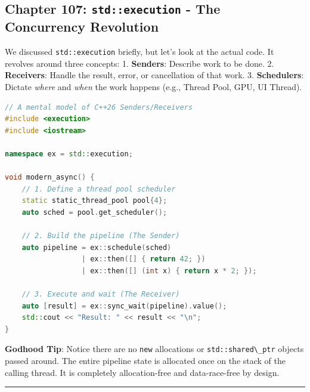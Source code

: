 \hypertarget{chapter-107-stdexecution---the-concurrency-revolution}{%
\subsection{\texorpdfstring{Chapter 107: \texttt{std::execution} - The
Concurrency
Revolution}{Chapter 107: std::execution - The Concurrency Revolution}}\label{chapter-107-stdexecution---the-concurrency-revolution}}

We discussed \passthrough{\lstinline!std::execution!} briefly, but let's
look at the actual code. It revolves around three concepts: 1.
\textbf{Senders}: Describe work to be done. 2. \textbf{Receivers}:
Handle the result, error, or cancellation of that work. 3.
\textbf{Schedulers}: Dictate \emph{where} and \emph{when} the work
happens (e.g., Thread Pool, GPU, UI Thread).

\begin{lstlisting}[language={C++}]
// A mental model of C++26 Senders/Receivers
#include <execution>
#include <iostream>

namespace ex = std::execution;

void modern_async() {
    // 1. Define a thread pool scheduler
    static static_thread_pool pool{4};
    auto sched = pool.get_scheduler();

    // 2. Build the pipeline (The Sender)
    auto pipeline = ex::schedule(sched) 
                  | ex::then([] { return 42; }) 
                  | ex::then([] (int x) { return x * 2; });

    // 3. Execute and wait (The Receiver)
    auto [result] = ex::sync_wait(pipeline).value();
    std::cout << "Result: " << result << "\n";
}
\end{lstlisting}

\textbf{Godhood Tip}: Notice there are no \passthrough{\lstinline!new!}
allocations or \passthrough{\lstinline!std::shared\_ptr!} objects passed
around. The entire pipeline state is allocated once on the stack of the
calling thread. It is completely allocation-free and data-race-free by
design.

\begin{center}\rule{0.5\linewidth}{0.5pt}\end{center}
